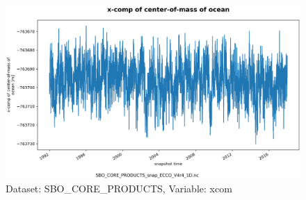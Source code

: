 \begin{figure}[H]
\centering
\includegraphics[scale=0.55]{../images/plots/oneD_plots/SBO_Core_Products/xcom.png}
\caption{Dataset: SBO\_CORE\_PRODUCTS, Variable: xcom}
\label{tab:table-SBO_CORE_PRODUCTS_xcom-Plot}
\end{figure}
\newpage
\pagebreak

